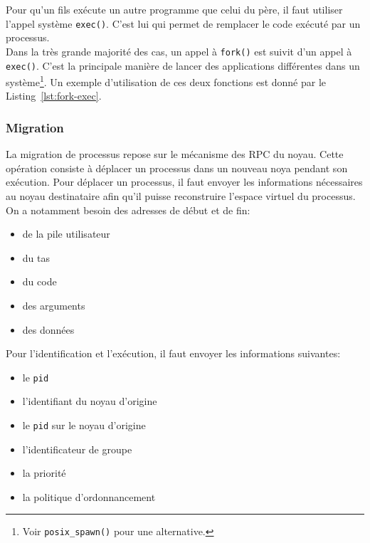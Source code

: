         Pour qu'un fils exécute un autre programme que celui du père, il faut
        utiliser l'appel système \texttt{exec()}. C'est lui qui permet de
        remplacer le code exécuté par un processus.\\

        Dans la très grande majorité des cas, un appel à \texttt{fork()} est
        suivit d'un appel à \texttt{exec()}. C'est la principale manière de
        lancer des applications différentes dans un système\footnote{Voir
          \texttt{posix\_spawn()} pour une alternative.}. Un exemple
          d'utilisation de ces deux fonctions est donné par le
          Listing~\ref{lst:fork-exec}.

         \FloatBarrier

      \subsubsection{Migration}

        La migration de processus repose sur le mécanisme des RPC du
        noyau. Cette opération consiste à déplacer un processus dans un nouveau
        noya pendant son exécution. Pour déplacer un processus, il faut envoyer
        les informations nécessaires au noyau destinataire afin qu'il puisse
        reconstruire l'espace virtuel du processus. On a notamment besoin des
        adresses de début et de fin:
        \begin{itemize}
          \item de la pile utilisateur
          \item du tas
          \item du code
          \item des arguments
          \item des données
        \end{itemize}
        Pour l'identification et l'exécution, il faut envoyer les informations
        suivantes:
        \begin{itemize}
          \item le \texttt{pid}
          \item l'identifiant du noyau d'origine
          \item le \texttt{pid} sur le noyau d'origine
          \item l'identificateur de groupe
          \item la priorité
          \item la politique d'ordonnancement\\
        \end{itemize}

